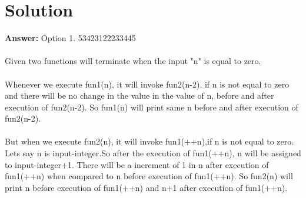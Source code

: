 \documentclass[journal,12pt,twocolumn]{IEEEtran}
\begin{document}
\section{\textbf{Solution}}
\textbf{Answer:} Option 1. 53423122233445
\\~\\
Given two functions will terminate when the input "n" is equal to zero.
\\~\\ 
Whenever we execute fun1(n), it will invoke fun2(n-2), if n is not equal to zero and there will be no change in the value in the value of n, before and after execution of fun2(n-2). So fun1(n) will print same n before and after execution of fun2(n-2).
\\~\\ 
But when we execute fun2(n), it will invoke fun1(++n),if n is not equal to zero. Lets say n is input-integer.So after the execution of fun1(++n), n will be assigned to input-integer+1. There will be a increment of 1 in n after execution of fun1(++n) when compared to n before execution of fun1(++n). So fun2(n) will print n before execution of fun1(++n) and n+1 after execution of fun1(++n).
\\~\\
\end{document}

